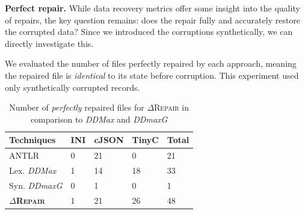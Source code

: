 \documentclass[sigconf,review,anonymous]{acmart}
\newcommand{\approach}{\textsc{$\Delta$Repair}\xspace}
\newcommand{\ddmax}{\textit{DDMax}\xspace}
\newcommand{\ddmaxg}{\textit{DDmaxG}\xspace}
\newcommand{\drepair}{\approach}
\begin{document}


%

\noindent\textbf{Perfect repair.} While data recovery metrics offer some insight
into the quality of repairs, the key question remains: does the repair fully and
accurately restore the corrupted data?
Since we introduced the corruptions synthetically, we can directly investigate
this.

We evaluated the number of files perfectly repaired by each approach, meaning
the repaired file is \emph{identical} to its state before corruption.
This experiment used only synthetically corrupted records.

\begin{table}[!tbp]\centering
\caption{Number of \textit{perfectly} repaired files for \approach in comparison to \ddmax and \ddmaxg
}
\begin{tabular}{|p{3.0cm}|p{1cm}|p{1cm}|p{1cm}|p{1cm}|}
\hline
\textbf{Techniques}&  \textbf{INI}&\textbf{cJSON} &\textbf{TinyC}&\textbf{Total}  \\
\hline
ANTLR  & 0 & 21 & 0 & 21 \\
Lex. \ddmax  & 1 & 14 & 18 & 33 \\
Syn. \ddmaxg & 0 & 1  & 0  & 1  \\
\hline
\textbf{\approach} &  1 & 21  & 26 & 48  \\
\hline
\end{tabular}
\label{tab:perfectrepairs}
\end{table}
\end{document}
